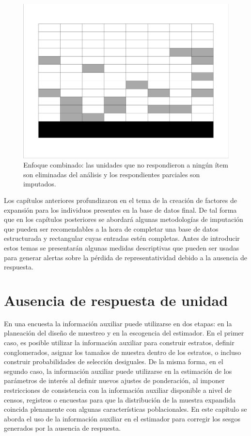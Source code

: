 \documentclass[
  12pt,
]{book}
\begin{document}
\begin{figure}
\includegraphics[width=0.5\linewidth]{Pics/j5} \caption{Enfoque combinado: las unidades que no respondieron a ningún ítem son eliminadas del análisis y los respondientes parciales son imputados.}\label{fig:figenfcomb}
\end{figure}

Los capítulos anteriores profundizaron en el tema de la creación de factores de expansión para los individuos presentes en la base de datos final. De tal forma que en los capítulos posteriores se abordará algunas metodologías de imputación que pueden ser recomendables a la hora de completar una base de datos estructurada y rectangular cuyas entradas estén completas. Antes de introducir estos temas se presentarán algunas medidas descriptivas que pueden ser usadas para generar alertas sobre la pérdida de representatividad debido a la ausencia de respuesta.

\hypertarget{ausencia-de-respuesta-de-unidad}{%
\chapter{Ausencia de respuesta de unidad}\label{ausencia-de-respuesta-de-unidad}}

En una encuesta la información auxiliar puede utilizarse en dos etapas: en la planeación del diseño de muestreo y en la escogencia del estimador. En el primer caso, es posible utilizar la información auxiliar para construir estratos, definir conglomerados, asignar los tamaños de muestra dentro de los estratos, o incluso construir probabilidades de selección desiguales. De la misma forma, en el segundo caso, la información auxiliar puede utilizarse en la estimación de los parámetros de interés al definir nuevos ajustes de ponderación, al imponer restricciones de consistencia con la información auxiliar disponible a nivel de censos, registros o encuestas para que la distribución de la muestra expandida coincida plenamente con algunas características poblacionales. En este capítulo se aborda el uso de la información auxiliar en el estimador para corregir los sesgos generados por la ausencia de respuesta.
\end{document}
